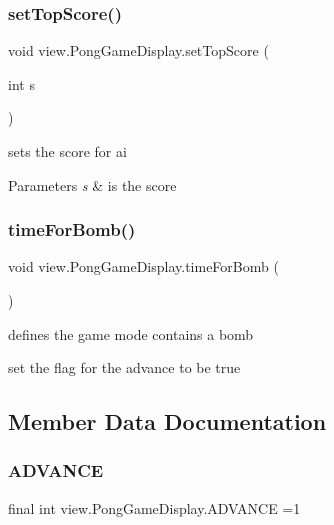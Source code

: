 \subsubsection{\texorpdfstring{set\+Top\+Score()}{setTopScore()}}
{\footnotesize\ttfamily void view.\+Pong\+Game\+Display.\+set\+Top\+Score (\begin{DoxyParamCaption}\item[{int}]{s }\end{DoxyParamCaption})}



sets the score for ai 


\begin{DoxyParams}{Parameters}
{\em s} & is the score \\
\hline
\end{DoxyParams}
\hypertarget{classview_1_1_pong_game_display_a67b7b51feffc6573e92ac9c979ade0e2}{}\label{classview_1_1_pong_game_display_a67b7b51feffc6573e92ac9c979ade0e2} 
\subsubsection{\texorpdfstring{time\+For\+Bomb()}{timeForBomb()}}
{\footnotesize\ttfamily void view.\+Pong\+Game\+Display.\+time\+For\+Bomb (\begin{DoxyParamCaption}{ }\end{DoxyParamCaption})}



defines the game mode contains a bomb 

set the flag for the advance to be true 

\subsection{Member Data Documentation}
\hypertarget{classview_1_1_pong_game_display_a3aa7541f41ee227f6f7c3acf0bd35871}{}\label{classview_1_1_pong_game_display_a3aa7541f41ee227f6f7c3acf0bd35871} 
\subsubsection{\texorpdfstring{A\+D\+V\+A\+N\+CE}{ADVANCE}}
{\footnotesize\ttfamily final int view.\+Pong\+Game\+Display.\+A\+D\+V\+A\+N\+CE =1\hspace{0.3cm}{\ttfamily [private]}}


